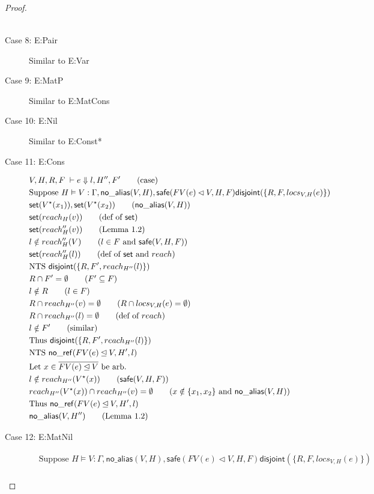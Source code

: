 \documentclass[11pt]{article}
\newcommand{\ms}[1]{\ensuremath{\mathsf{#1}}}
\newcommand{\na}[1]{\mathsf{no\_alias}(#1)}
\newcommand{\nr}[1]{\mathsf{no\_ref}(#1)}
\newcommand{\safe}[1]{\mathsf{safe}(#1)}
\newcommand{\dist}[1]{\mathsf{disjoint}(#1)}
\begin{document}
\begin{proof}
\begin{description}
\begin{align*}
  \end{align*}
  \item[Case 8: E:Pair]
  Similar to E:Var
  \item[Case 9: E:MatP]
  Similar to E:MatCons
  \item[Case 10: E:Nil]
  Similar to E:Const*
  \item[Case 11: E:Cons]
  \begin{align*}
  &V,H,R,F \; \vdash e \Downarrow l,H'',F' \tag{case}\\
  &\text{Suppose } H \vDash V : \Gamma, \na{V,H}, \safe{FV(e) \lhd V,H,F} \dist{\{R,F,locs_{V,H}(e)\}}\\
  &\ms{set}(V^{\star}(x_1)),\ms{set}(V^{\star}(x_2)) \tag{$\na{V,H}$}\\
  &\ms{set}(reach_H(v)) \tag{def of $\ms{set}$}\\
  &\ms{set}(reach_H''(v)) \tag{Lemma 1.2}\\
  &l \notin reach_H''(V) \tag{$l \in F$ and $\safe{V,H,F}$}\\
  &\ms{set}(reach_H''(l)) \tag{def of $\ms{set}$ and $reach$}\\
  &\text{NTS } \dist{\{R,F',reach_{H''}(l)\}}\\
  &R \cap F' = \emptyset \tag{$F' \subseteq F$}\\
  &l \notin R \tag{$l \in F$}\\
  &R \cap reach_{H''}(v) = \emptyset \tag{$R \cap locs_{V,H}(e) = \emptyset$}\\
  &R \cap reach_{H''}(l) = \emptyset \tag {def of $reach$}\\
  &l \notin F' \tag{similar}\\
  &\text{Thus } \dist{\{R,F',reach_{H''}(l)\}}\\
  &\text{NTS } \nr{FV(e) \unlhd V, H', l}\\
  &\text{Let } x \in \overline{FV(e) \unlhd V} \text{ be arb.}\\
  &l \notin reach_{H''}(V^{\star}(x)) \tag{$\safe{V,H,F}$}\\
  &reach_{H''}(V^{\star}(x)) \cap reach_{H''}(v) = \emptyset \tag{$x \notin \{x_1,x_2\}$ and $\na{V,H}$}\\
  &\text{Thus } \nr{FV(e) \unlhd V, H', l}\\
  &\na{V,H''} \tag{Lemma 1.2}\\
  \end{align*}
  \item[Case 12: E:MatNil]
  \begin{align*}
  &\text{Suppose } H \vDash V : \Gamma, \na{V,H}, \safe{FV(e) \lhd V,H,F} \dist{\{R,F,locs_{V,H}(e)\}}\\

\end{align*}
\end{description}
\end{proof}
\end{document}
